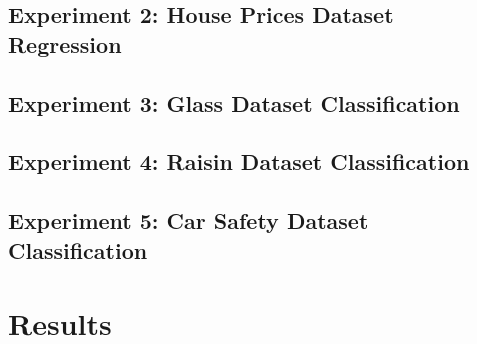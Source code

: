 \documentclass[a4paper, 12pt]{report}
\begin{document}
\section{Experiment 2: House Prices Dataset Regression}

\section{Experiment 3: Glass Dataset Classification}

\section{Experiment 4: Raisin Dataset Classification}

\section{Experiment 5: Car Safety Dataset Classification}

\chapter{Results}
\label{ch:Results}


\end{document}
